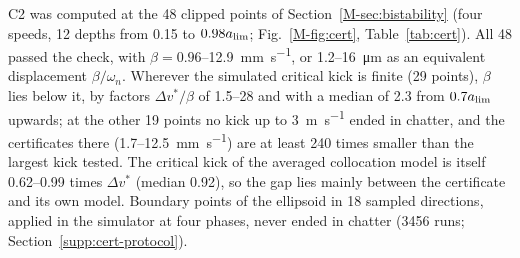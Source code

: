 C2 was computed at the 48 clipped points of Section~\ref{M-sec:bistability} (four speeds, 12 depths from 0.15 to $0.98a_{\lim}$; Fig.~\ref{M-fig:cert}, Table~\ref{tab:cert}). All 48 passed the check, with $\beta=0.96$--\SI{12.9}{\milli\metre\per\second}, or 1.2--\SI{16}{\micro\metre} as an equivalent displacement $\beta/\omega_n$. Wherever the simulated critical kick is finite (29 points), $\beta$ lies below it, by factors $\Delta v^*/\beta$ of 1.5--28 and with a median of 2.3 from $0.7a_{\lim}$ upwards; at the other 19 points no kick up to \SI{3}{\metre\per\second} ended in chatter, and the certificates there (1.7--\SI{12.5}{\milli\metre\per\second}) are at least 240 times smaller than the largest kick tested. The critical kick of the averaged collocation model is itself 0.62--0.99 times $\Delta v^*$ (median 0.92), so the gap lies mainly between the certificate and its own model. Boundary points of the ellipsoid in 18 sampled directions, applied in the simulator at four phases, never ended in chatter (3456 runs; Section~\ref{supp:cert-protocol}).

